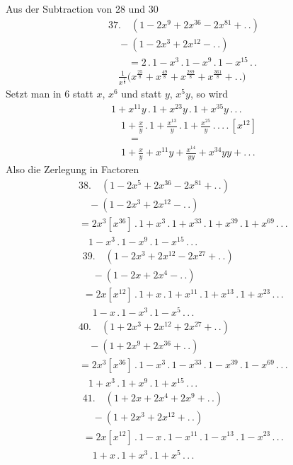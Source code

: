 Aus der Subtraction von 28 und 30
\[
\begin{gathered}
37.\quad (1-2x^9+2x^{36}-2x^{81}+ .\,.)\\[8pt]\quad{}-(1-2x^3+2x^{12}- .\,.)\\[8pt]
\qquad=2\,.\,1-x^3\,.\,1-x^9\,.\,1-x^{15}\,.\,.\,
\\[8pt]\quad{}\frac{1}{x^{\frac18}}\bigl(x^{\frac{25}{8}}+x^{\frac{49}{8}}+x^{\frac{289}{8}}+x^{\frac{361}{8}}+ .\,.\bigr)
\end{gathered}
\]
Setzt man in 6 statt $x$, $x^6$ und statt $y$, $x^5y$, so wird
\[
\begin{gathered}
1+x^{11}y\,.\,1+x^{23}y\,.\,1+x^{35}y\,.\,.\,.\,
\\[8pt]\quad{}1+\frac{x}{y}\,.\,1+\frac{x^{13}}{y}\,.\,1+\frac{x^{25}}{y}\,.\,.\,.\,.\,[x^{12}]\\[8pt]
\qquad=\\[8pt]\quad{}1+\frac{x}{y}+x^{11}y+\frac{x^{14}}{yy}+x^{34}yy+ .\,.\,.
\end{gathered}
\]
Also die Zerlegung in Factoren
\[
\begin{gathered}
38.\quad (1-2x^5+2x^{36}-2x^{81}+ .\,.)\\[8pt]\quad{}-(1-2x^3+2x^{12}- .\,.)\\[8pt]
=2x^3[x^{36}]\,.\,1+x^3\,.\,1+x^{33}\,.\,1+x^{39}\,.\,1+x^{69}\,.\,.\,.\,\\[8pt]\quad{}
1-x^3\,.\,1-x^9\,.\,1-x^{15}\,.\,.\,.
\end{gathered}
\]
\[
\begin{gathered}
39.\quad (1-2x^3+2x^{12}-2x^{27}+ .\,.)\\[8pt]\quad{}-(1-2x+2x^4- .\,.)\\[8pt]
=2x[x^{12}]\,.\,1+x\,.\,1+x^{11}\,.\,1+x^{13}\,.\,1+x^{23}\,.\,.\,.\,\\[8pt]\quad{}
1-x\,.\,1-x^3\,.\,1-x^5\,.\,.\,.
\end{gathered}
\]
\[
\begin{gathered}
40.\quad (1+2x^3+2x^{12}+2x^{27}+ .\,.)\\[8pt]\quad{}-(1+2x^9+2x^{36}+ .\,.)\\[8pt]
=2x^3[x^{36}]\,.\,1-x^3\,.\,1-x^{33}\,.\,1-x^{39}\,.\,1-x^{69}\,.\,.\,.\,\\[8pt]\quad{}
1+x^3\,.\,1+x^9\,.\,1+x^{15}\,.\,.\,.
\end{gathered}
\]
\[
\begin{gathered}
41.\quad (1+2x+2x^4+2x^9+ .\,.)\\[8pt]\quad{}-(1+2x^3+2x^{12}+ .\,.)\\[8pt]
=2x[x^{12}]\,.\,1-x\,.\,1-x^{11}\,.\,1-x^{13}\,.\,1-x^{23}\,.\,.\,.\,\\[8pt]\quad{}
1+x\,.\,1+x^3\,.\,1+x^5\,.\,.\,.
\end{gathered}
\]
